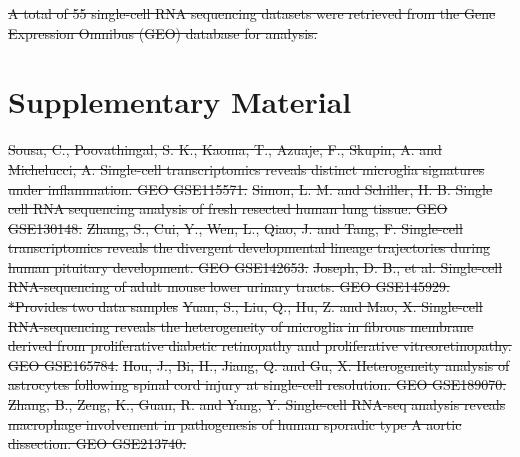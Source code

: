 \documentclass[referee, pdflatex, sn-vancouver-num]{sn-jnl}
\providecommand{\DIFdeltex}[1]{{\protect\color{red}\sout{#1}}}                      %
\providecommand{\DIFaddbegin}{} %
\providecommand{\DIFaddend}{} %
\providecommand{\DIFdelbegin}{} %
\providecommand{\DIFdelend}{} %
\providecommand{\DIFdel}[1]{\texorpdfstring{\DIFdeltex{#1}}{}} %
\newcommand{\DIFscaledelfig}{0.5}
\newlength{\DIFdelgraphicswidth} %
\newlength{\DIFdelgraphicsheight} %
\newcommand{\DIFaddincludegraphics}[2][]{{\color{blue}\fbox{\DIFOincludegraphics[#1]{#2}}}} %
\newcommand{\DIFdelincludegraphics}[2][]{%
\sbox{\DIFdelgraphicsbox}{\DIFOincludegraphics[#1]{#2}}%
\settoboxwidth{\DIFdelgraphicswidth}{\DIFdelgraphicsbox} %
\settoboxtotalheight{\DIFdelgraphicsheight}{\DIFdelgraphicsbox} %
\scalebox{\DIFscaledelfig}{%
\parbox[b]{\DIFdelgraphicswidth}{\usebox{\DIFdelgraphicsbox}\\[-\baselineskip] \rule{\DIFdelgraphicswidth}{0em}}\llap{\resizebox{\DIFdelgraphicswidth}{\DIFdelgraphicsheight}{%
\setlength{\unitlength}{\DIFdelgraphicswidth}%
\begin{picture}(1,1)%
\thicklines\linethickness{2pt} %
{\color[rgb]{1,0,0}\put(0,0){\framebox(1,1){}}}%
{\color[rgb]{1,0,0}\put(0,0){\line( 1,1){1}}}%
{\color[rgb]{1,0,0}\put(0,1){\line(1,-1){1}}}%
\end{picture}%
}\hspace*{3pt}}} %
} %
\DeclareRobustCommand{\DIFaddbegin}{\DIFOaddbegin \let\includegraphics\DIFaddincludegraphics} %
\DeclareRobustCommand{\DIFaddend}{\DIFOaddend \let\includegraphics\DIFOincludegraphics} %
\DeclareRobustCommand{\DIFdelbegin}{\DIFOdelbegin \let\includegraphics\DIFdelincludegraphics} %
\DeclareRobustCommand{\DIFdelend}{\DIFOaddend \let\includegraphics\DIFOincludegraphics} %
\begin{document}
\begin{appendices}
\DIFdelbegin \DIFdel{A total of 55 single-cell RNA sequencing datasets were retrieved from the Gene Expression Omnibus (GEO) database for analysis.
}\DIFdelend \DIFaddbegin \section{Supplementary Material}\label{app:supp}
\DIFaddend

\DIFdelbegin %
\DIFdel{Sousa, C., Poovathingal, S. K., Kaoma, T., Azuaje, F., Skupin, A. and Michelucci, A. Single-cell transcriptomics reveals distinct microglia signatures under inflammation. GEO GSE115571. }%
\DIFdel{Simon, L. M. and Schiller, H. B. Single cell RNA sequencing analysis of fresh resected human lung tissue. GEO GSE130148. }%
\DIFdel{Zhang, S., Cui, Y., Wen, L., Qiao, J. and Tang, F. Single-cell transcriptomics reveals the divergent developmental lineage trajectories during human pituitary development. GEO GSE142653. }%
\DIFdel{Joseph, D. B., et al. Single-cell RNA-sequencing of adult mouse lower urinary tracts. GEO GSE145929. }%
\DIFdel{*Provides two data samples
	}%
\DIFdel{Yuan, S., Liu, Q., Hu, Z. and Mao, X. Single-cell RNA-sequencing reveals the heterogeneity of microglia in fibrous membrane derived from proliferative diabetic retinopathy and proliferative vitreoretinopathy. GEO GSE165784. }%
\DIFdel{Hou, J., Bi, H., Jiang, Q. and Gu, X. Heterogeneity analysis of astrocytes following spinal cord injury at single-cell resolution. GEO GSE189070. }%
\DIFdel{Zhang, B., Zeng, K., Guan, R. and Yang, Y. Single-cell RNA-seq analysis reveals macrophage involvement in pathogenesis of human sporadic type A aortic dissection. GEO GSE213740. }%

\end{appendices}
\end{document}
